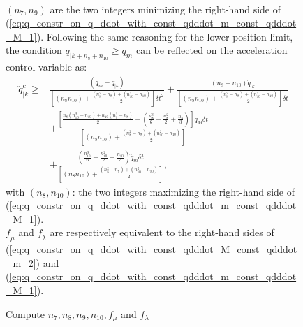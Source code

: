 \begin{figure}[!htbp]
\begin{equation}
\begin{split}
\end{split}
\label{eq:q_constr_on_q_ddot_with_const_qdddot_m_const_qdddot_M_1}
\end{equation}
$(n_7, n_9)$ are the two integers minimizing the right-hand side of (\ref{eq:q_constr_on_q_ddot_with_const_qdddot_m_const_qdddot_M_1}).
Following the same reasoning for the lower position limit, the condition $q_{|k+n_8+n_{10}} \geq q_{m}$ can be reflected on the acceleration control variable as:
\begin{equation}
\begin{split}
\ddot{q}_{|k}^{c} \geq & \frac{\left(q_m-q_{|k}\right)}{\left[\left(n_8 n_{10}\right)+\frac{\left(n_{8}^{2}-n_8\right)+\left(n_{10}^{2}-n_{10}\right)}{2}\right] \delta t^2} + \frac{\left(n_8+n_{10}\right) \dot{q}_{|k}}{\left[\left(n_8 n_{10}\right)+\frac{\left(n_{8}^{2}-n_8\right)+\left(n_{10}^{2}-n_{10}\right)}{2}\right] \delta t} \\
& + \frac{\left[\frac{n_{8}\left(n_{10}^{2}-n_{10}\right)+n_{10}\left(n_{8}^{2}-n_8\right)}{2}+\left(\frac{n_{8}^{3}}{6}-\frac{n_{8}^{2}}{2}+\frac{n_{8}}{3}\right)\right] \dddot{q}_M \delta t}{\left[\left(n_8 n_{10}\right)+\frac{\left(n_{8}^{2}-n_8\right)+\left(n_{10}^{2}-n_{10}\right)}{2}\right]} \\
& + \frac{\left(\frac{n_{10}^{3}}{6}-\frac{n_{10}^{2}}{2}+\frac{n_{10}}{3}\right) \dddot{q}_m \delta t}{\left[\left(n_8 n_{10}\right)+\frac{\left(n_{8}^{2}-n_8\right)+\left(n_{10}^{2}-n_{10}\right)}{2}\right]}, 
\end{split}
\label{eq:q_constr_on_q_ddot_with_const_qdddot_M_const_qdddot_m_2}
\end{equation}
with $(n_8, n_{10})$: the two integers maximizing the right-hand side of (\ref{eq:q_constr_on_q_ddot_with_const_qdddot_m_const_qdddot_M_1}). \\ $\textit{f}_{\mu}$ and $\textit{f}_{\lambda}$ are respectively equivalent to the right-hand sides of (\ref{eq:q_constr_on_q_ddot_with_const_qdddot_M_const_qdddot_m_2}) and (\ref{eq:q_constr_on_q_ddot_with_const_qdddot_m_const_qdddot_M_1}). \\ 
\noindent\begin{minipage}{\textwidth}
\renewcommand\footnoterule{}                  %
\begin{algorithm}[H]
\caption{Compute $n_{7}, n_{8}, n_{9}, n_{10}, f_{\mu}$ and $f_{\lambda}$}
\label{alg:compute_f_mu_f_lambda_n_7_n_8_n_9_n_10}
\begin{algorithmic}[1]

\end{algorithmic}
\end{algorithm}
\end{minipage}
\end{figure}

